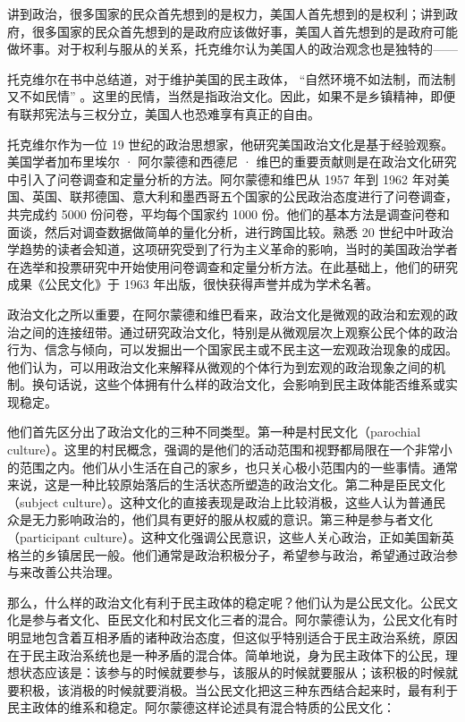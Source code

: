 讲到政治，很多国家的民众首先想到的是权力，美国人首先想到的是权利；讲到政府，很多国家的民众首先想到的是政府应该做好事，美国人首先想到的是政府可能做坏事。对于权利与服从的关系，托克维尔认为美国人的政治观念也是独特的——


托克维尔在书中总结道，对于维护美国的民主政体， “自然环境不如法制，而法制又不如民情” 。这里的民情，当然是指政治文化。因此，如果不是乡镇精神，即便有联邦宪法与三权分立，美国人也恐难享有真正的自由。


托克维尔作为一位 19 世纪的政治思想家，他研究美国政治文化是基于经验观察。美国学者加布里埃尔 · 阿尔蒙德和西德尼 · 维巴的重要贡献则是在政治文化研究中引入了问卷调查和定量分析的方法。阿尔蒙德和维巴从 1957 年到 1962 年对美国、英国、联邦德国、意大利和墨西哥五个国家的公民政治态度进行了问卷调查，共完成约 5000 份问卷，平均每个国家约 1000 份。他们的基本方法是调查问卷和面谈，然后对调查数据做简单的量化分析，进行跨国比较。熟悉 20 世纪中叶政治学趋势的读者会知道，这项研究受到了行为主义革命的影响，当时的美国政治学者在选举和投票研究中开始使用问卷调查和定量分析方法。在此基础上，他们的研究成果《公民文化》于 1963 年出版，很快获得声誉并成为学术名著。

政治文化之所以重要，在阿尔蒙德和维巴看来，政治文化是微观的政治和宏观的政治之间的连接纽带。通过研究政治文化，特别是从微观层次上观察公民个体的政治行为、信念与倾向，可以发掘出一个国家民主或不民主这一宏观政治现象的成因。他们认为，可以用政治文化来解释从微观的个体行为到宏观的政治现象之间的机制。换句话说，这些个体拥有什么样的政治文化，会影响到民主政体能否维系或实现稳定。

他们首先区分出了政治文化的三种不同类型。第一种是村民文化（parochial culture）。这里的村民概念，强调的是他们的活动范围和视野都局限在一个非常小的范围之内。他们从小生活在自己的家乡，也只关心极小范围内的一些事情。通常来说，这是一种比较原始落后的生活状态所塑造的政治文化。第二种是臣民文化（subject culture）。这种文化的直接表现是政治上比较消极，这些人认为普通民众是无力影响政治的，他们具有更好的服从权威的意识。第三种是参与者文化（participant culture）。这种文化强调公民意识，这些人关心政治，正如美国新英格兰的乡镇居民一般。他们通常是政治积极分子，希望参与政治，希望通过政治参与来改善公共治理。

那么，什么样的政治文化有利于民主政体的稳定呢？他们认为是公民文化。公民文化是参与者文化、臣民文化和村民文化三者的混合。阿尔蒙德认为，公民文化有时明显地包含着互相矛盾的诸种政治态度，但这似乎特别适合于民主政治系统，原因在于民主政治系统也是一种矛盾的混合体。简单地说，身为民主政体下的公民，理想状态应该是：该参与的时候就要参与，该服从的时候就要服从；该积极的时候就要积极，该消极的时候就要消极。当公民文化把这三种东西结合起来时，最有利于民主政体的维系和稳定。阿尔蒙德这样论述具有混合特质的公民文化：

